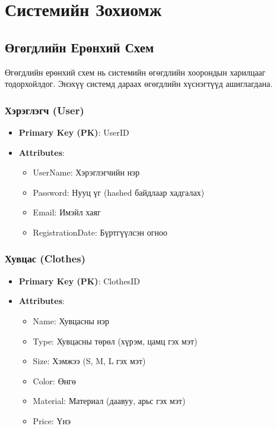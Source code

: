 \chapter{Системийн Зохиомж}
\label{chapter4}

\section{Өгөгдлийн Ерөнхий Схем}
Өгөгдлийн ерөнхий схем нь системийн өгөгдлийн хоорондын харилцааг тодорхойлдог. Энэхүү системд дараах өгөгдлийн хүснэгтүүд ашиглагдана.

\subsection{Хэрэглэгч (User)}
\begin{itemize}
    \item \textbf{Primary Key (PK)}: UserID
    \item \textbf{Attributes}:
    \begin{itemize}
        \item UserName: Хэрэглэгчийн нэр
        \item Password: Нууц үг (hashed байдлаар хадгалах)
        \item Email: Имэйл хаяг
        \item RegistrationDate: Бүртгүүлсэн огноо
    \end{itemize}
\end{itemize}

\subsection{Хувцас (Clothes)}
\begin{itemize}
    \item \textbf{Primary Key (PK)}: ClothesID
    \item \textbf{Attributes}:
    \begin{itemize}
        \item Name: Хувцасны нэр
        \item Type: Хувцасны төрөл (хүрэм, цамц гэх мэт)
        \item Size: Хэмжээ (S, M, L гэх мэт)
        \item Color: Өнгө
        \item Material: Материал (даавуу, арьс гэх мэт)
        \item Price: Үнэ
    \end{itemize}
\end{itemize}

